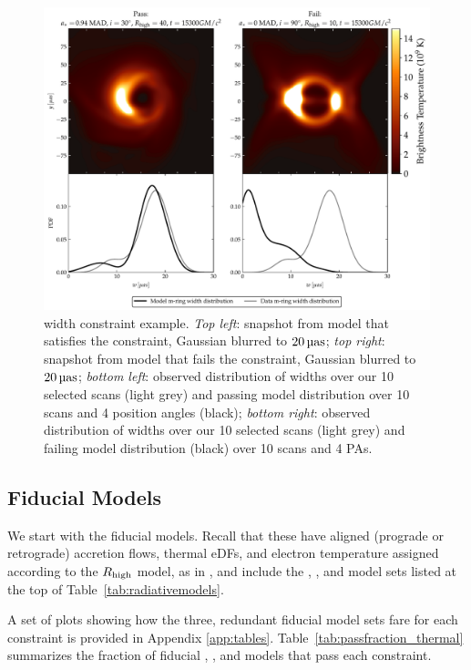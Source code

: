 \begin{figure}
  \centering
  \includegraphics[width=6.5in]{figures/mring_width_example.pdf}
  \caption{\Mring width constraint example.
    \emph{Top left}: snapshot from model that satisfies the constraint, Gaussian blurred to $20\uas$;
    \emph{top right}: snapshot from model that fails the constraint, Gaussian blurred to $20\uas$;
    \emph{bottom left}: observed distribution of \mring widths over our 10 selected scans (light grey) and passing model  distribution over 10 scans and 4 position angles (black);
    \emph{bottom right}: observed distribution of \mring widths over our 10 selected scans (light grey) and failing model  distribution (black) over 10 scans and 4 PAs.}
  \label{fig:mring_width_example}
\end{figure}

\subsection{Fiducial Models}\label{subsec:thermal}

We start with the fiducial models.
Recall that these have aligned (prograde or retrograde) accretion flows, thermal eDFs, and electron temperature assigned according to the $R_\mathrm{high}$ model, as in , and include the  \kharma, \bhac, and \hamr model sets listed at the top of Table~\ref{tab:radiativemodels}.

A set of plots showing how the three, redundant fiducial model sets fare for each constraint is provided in Appendix \ref{app:tables}.
Table~\ref{tab:passfraction_thermal} summarizes the fraction of fiducial \kharma, \bhac, and \hamr models that pass each constraint.

